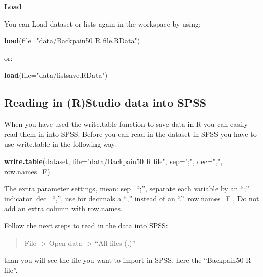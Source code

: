 \documentclass[]{book}
\newenvironment{Shaded}{\begin{snugshade}}{\end{snugshade}}
\newcommand{\KeywordTok}[1]{\textcolor[rgb]{0.13,0.29,0.53}{\textbf{#1}}}
\newcommand{\DataTypeTok}[1]{\textcolor[rgb]{0.13,0.29,0.53}{#1}}
\newcommand{\StringTok}[1]{\textcolor[rgb]{0.31,0.60,0.02}{#1}}
\newcommand{\NormalTok}[1]{#1}
\begin{document}
\textbf{Load}

You can Load dataset or lists again in the workspace by using:

\begin{Shaded}
\begin{Highlighting}[]
\KeywordTok{load}\NormalTok{(}\DataTypeTok{file=}\StringTok{"data/Backpain50 R file.RData"}\NormalTok{)}
\end{Highlighting}
\end{Shaded}

or:

\begin{Shaded}
\begin{Highlighting}[]
\KeywordTok{load}\NormalTok{(}\DataTypeTok{file=}\StringTok{"data/listsave.RData"}\NormalTok{)}
\end{Highlighting}
\end{Shaded}

\subsection{Reading in (R)Studio data into
SPSS}\label{reading-in-rstudio-data-into-spss}

When you have used the write.table function to save data in R you can
easily read them in into SPSS. Before you can read in the dataset in
SPSS you have to use write.table in the following way:

\begin{Shaded}
\begin{Highlighting}[]
\KeywordTok{write.table}\NormalTok{(dataset, }\DataTypeTok{file=}\StringTok{"data/Backpain50 R file"}\NormalTok{, }\DataTypeTok{sep=}\StringTok{";"}\NormalTok{, }\DataTypeTok{dec=}\StringTok{","}\NormalTok{, }\DataTypeTok{row.names=}\NormalTok{F)}
\end{Highlighting}
\end{Shaded}

The extra parameter settings, mean: sep=``;'', separate each variable by
an ``;'' indicator. dec=``,'', use for decimals a ``,'' instead of an
``.''. row.names=F , Do not add an extra column with row.names.

Follow the next steps to read in the data into SPSS:

\begin{quote}
File -\textgreater{} Open data -\textgreater{} ``All files (\emph{.})''
\end{quote}

than you will see the file you want to import in SPSS, here the
``Backpain50 R file''.
\end{document}
